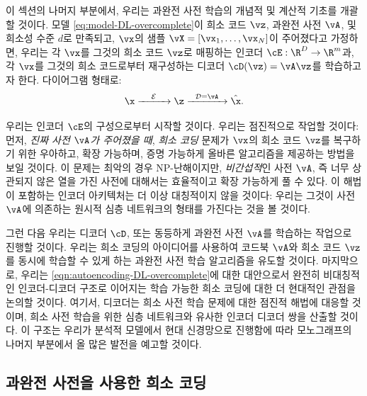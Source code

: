 \documentclass[../../book-main_ko.tex]{subfiles}
\begin{document}
이 섹션의 나머지 부분에서, 우리는 과완전 사전 학습의 개념적 및 계산적 기초를 개괄할 것이다.
모델 \eqref{eq:model-DL-overcomplete}이 희소 코드 \(\vz\), 과완전 사전 \(\vA\), 및 희소성 수준 \(d\)로 만족되고, \(\vx\)의 샘플 \(\vX = [\vx_1, \dots, \vx_N]\)이 주어졌다고 가정하면, 우리는 각 \(\vx\)를 그것의 {희소 코드} \(\vz\)로 매핑하는 인코더 \(\cE : \R^D \to \R^m\)과, 각 \(\vx\)를 그것의 희소 코드로부터 재구성하는 디코더 \(\cD(\vz) = \vA \vz\)를 학습하고자 한다.
다이어그램 형태로:
\begin{equation}
\x \xrightarrow{\hspace{4mm} \mathcal{E} \hspace{4mm}}  \z \xrightarrow{\hspace{2mm} \mathcal{D} = \vA \hspace{2mm}}   \hat{\x}.
\label{eqn:autoencoding-DL-overcomplete}
\end{equation}

우리는 인코더 \(\cE\)의 구성으로부터 시작할 것이다.
우리는 점진적으로 작업할 것이다: 먼저, \textit{진짜 사전 \(\vA\)가 주어졌을 때}, \textit{희소 코딩} 문제가 \(\vx\)의 희소 코드 \(\vz\)를 복구하기 위한 우아하고, 확장 가능하며, 증명 가능하게 올바른 알고리즘을 제공하는 방법을 보일 것이다.
이 문제는 최악의 경우 NP-난해이지만, \textit{비간섭적}인 사전 \(\vA\), 즉 너무 상관되지 않은 열을 가진 사전에 대해서는 효율적이고 확장 가능하게 풀 수 있다.
이 해법이 포함하는 인코더 아키텍처는 더 이상 대칭적이지 않을 것이다: 우리는 그것이 사전 \(\vA\)에 의존하는 원시적 심층 네트워크의 형태를 가진다는 것을 볼 것이다.

그런 다음 우리는 디코더 \(\cD\), 또는 동등하게 과완전 사전 \(\vA\)를 학습하는 작업으로 진행할 것이다.
우리는 희소 코딩의 아이디어를 사용하여 코드북 \(\vA\)와 희소 코드 \(\vz\)를 동시에 학습할 수 있게 하는 과완전 사전 학습 알고리즘을 유도할 것이다.
마지막으로, 우리는 \eqref{eqn:autoencoding-DL-overcomplete}에 대한 대안으로서 완전히 비대칭적인 인코더-디코더 구조로 이어지는 학습 가능한 희소 코딩에 대한 더 현대적인 관점을 논의할 것이다.
여기서, 디코더는 희소 사전 학습 문제에 대한 점진적 해법에 대응할 것이며, 희소 사전 학습을 위한 심층 네트워크와 유사한 인코더 디코더 쌍을 산출할 것이다.
이 구조는 우리가 분석적 모델에서 현대 신경망으로 진행함에 따라 모노그래프의 나머지 부분에서 올 많은 발전을 예고할 것이다.



\subsection{과완전 사전을 사용한 희소 코딩}
\end{document}
